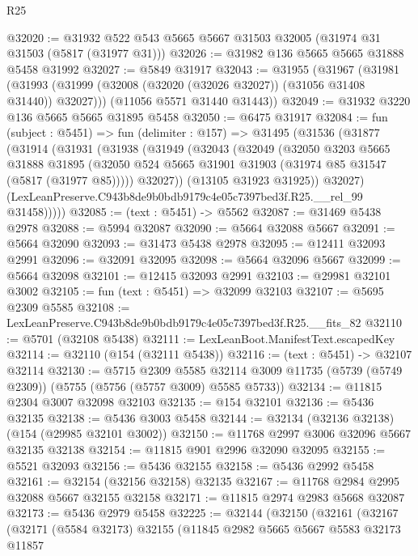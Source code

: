 \begin{lexlean}{R25}
\begin{coremodule}
@32020 := @31932 @522 @543 @5665 @5667 @31503 @32005 (@31974 @31 @31503 (@5817 (@31977 @31)))
@32026 := @31982 @136 @5665 @5665 @31888 @5458 @31992
@32027 := @5849 @31917
@32043 := @31955
    (@31967
      (@31981 (@31993 (@31999 (@32008 (@32020 (@32026 @32027)) (@31056 @31408 @31440)) @32027)))
      (@11056 @5571 @31440 @31443))
@32049 := @31932 @3220 @136 @5665 @5665 @31895 @5458
@32050 := @6475 @31917
@32084 := fun (subject : @5451) =>
  fun (delimiter : @157) =>
  @31495
    (@31536
      (@31877
        (@31914
          (@31931
            (@31938
              (@31949
                (@32043
                  (@32049
                    (@32050
                      @3203
                      @5665
                      @31888
                      @31895
                      (@32050 @524 @5665 @31901 @31903 (@31974 @85 @31547 (@5817 (@31977 @85)))))
                    @32027))
                (@13105 @31923 @31925))
              @32027)
            (LexLeanPreserve.C943b8de9b0bdb9179c4e05c7397bed3f.R25.__rel_99 @31458)))))
@32085 := (text : @5451) -> @5562
@32087 := @31469 @5438 @2978
@32088 := @5994 @32087
@32090 := @5664 @32088 @5667
@32091 := @5664 @32090
@32093 := @31473 @5438 @2978
@32095 := @12411 @32093 @2991
@32096 := @32091 @32095
@32098 := @5664 @32096 @5667
@32099 := @5664 @32098
@32101 := @12415 @32093 @2991
@32103 := @29981 @32101 @3002
@32105 := fun (text : @5451) => @32099 @32103
@32107 := @5695 @2309 @5585
@32108 := LexLeanPreserve.C943b8de9b0bdb9179c4e05c7397bed3f.R25.__fits_82
@32110 := @5701 (@32108 @5438)
@32111 := LexLeanBoot.ManifestText.escapedKey
@32114 := @32110 (@154 (@32111 @5438))
@32116 := (text : @5451) -> @32107 @32114
@32130 := @5715
    @2309
    @5585
    @32114
    @3009
    @11735
    (@5739 (@5749 @2309))
    (@5755 (@5756 (@5757 @3009) @5585 @5733))
@32134 := @11815 @2304 @3007 @32098 @32103
@32135 := @154 @32101
@32136 := @5436 @32135
@32138 := @5436 @3003 @5458
@32144 := @32134 (@32136 @32138) (@154 (@29985 @32101 @3002))
@32150 := @11768 @2997 @3006 @32096 @5667 @32135 @32138
@32154 := @11815 @901 @2996 @32090 @32095
@32155 := @5521 @32093
@32156 := @5436 @32155
@32158 := @5436 @2992 @5458
@32161 := @32154 (@32156 @32158) @32135
@32167 := @11768 @2984 @2995 @32088 @5667 @32155 @32158
@32171 := @11815 @2974 @2983 @5668 @32087
@32173 := @5436 @2979 @5458
@32225 := @32144
    (@32150
      (@32161
        (@32167
          (@32171
            (@5584 @32173)
            @32155
            (@11845
              @2982
              @5665
              @5667
              @5583
              @32173
              @11857

\end{coremodule}
\end{lexlean}
